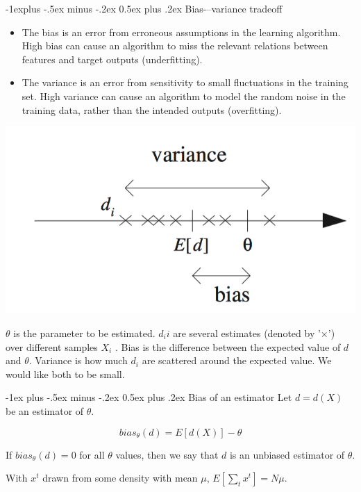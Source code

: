 \documentclass[10pt,letterpaper]{article}
\makeatletter
\renewcommand{\section}{\@startsection{section}{1}{0mm}%
                                {-1ex plus -.5ex minus -.2ex}%
                                {0.5ex plus .2ex}%
                                {\normalfont\large\bfseries}}
\renewcommand{\subsection}{\@startsection{subsection}{2}{0mm}%
                                {-1explus -.5ex minus -.2ex}%
                                {0.5ex plus .2ex}%
                                {\normalfont\normalsize\bfseries}}
\makeatother
\begin{document}
\begin{multicols}{3}
\subsection{Bias-–variance tradeoff}
\begin{itemize}
	\item The bias is an error from erroneous assumptions in the learning algorithm. High bias can cause an algorithm to miss the relevant relations between features and target outputs (underfitting).
	\item The variance is an error from sensitivity to small fluctuations in the training set. High variance can cause an algorithm to model the random noise in the training data, rather than the intended outputs (overfitting).
\end{itemize}

\includegraphics[scale=.6]{images/bias-variance.png}

$\theta$ is the parameter to be estimated. $d_ii$ are several estimates (denoted by '×') over diﬀerent samples $X_i$ . Bias is the diﬀerence between the expected value of $d$ and $\theta$. Variance is how much $d_i$ are scattered around the expected value. We would like both to be small.

\section{Bias of an estimator}
Let $d = d(X)$ be an estimator of $\theta$.

\begin{equation*}
bias_{\theta}(d) = E[d(X)] - \theta
\end{equation*}

If $bias_{\theta}(d)= 0$ for all $\theta$ values, then we say that $d$ is an unbiased estimator of $\theta$.

With $x^t$ drawn from some density with mean $\mu$, $E[\sum_t x^t] = N \mu$.


\end{multicols}
\end{document}

